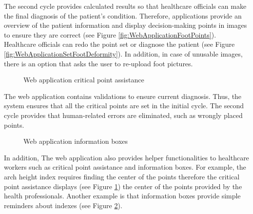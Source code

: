 The second cycle provides calculated results so that healthcare officials can make the final diagnosis of the patient's condition. Therefore, applications provide an overview of the patient information and display decision-making points in images to ensure they are correct (see Figure \ref{fig:WebApplicationFootPoints}). Healthcare officials can redo the point set or diagnose the patient (see Figure \ref{fig:WebApplicationSetFootDeformity}). In addition, in case of unusable images, there is an option that asks the user to re-upload foot pictures.

\begin{figure}[htbp]
\centering
{}
\caption{Web application critical point assistance}
\label{fig:WebApplicationCriticalPointAssistance}
\end{figure}

The web application contains validations to ensure current diagnosis. Thus, the system ensures that all the critical points are set in the initial cycle. The second cycle provides that human-related errors are eliminated, such as wrongly placed points. 

\begin{figure}[htbp]
\centering
{}
\caption{Web application information boxes}
\label{fig:WebApplicationInformationBoxes}
\end{figure}

In addition, The web application also provides helper functionalities to healthcare workers such as critical point assistance and information boxes. For example, the arch height index requires finding the center of the points therefore the critical point assistance displays (see Figure \ref{fig:WebApplicationCriticalPointAssistance}) the center of the points provided by the health professionals. Another example is that information boxes provide simple reminders about indexes (see Figure \ref{fig:WebApplicationInformationBoxes}).

